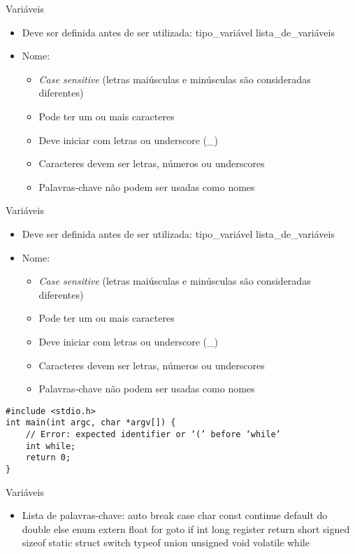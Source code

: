 \documentclass[t, aspectratio=169]{beamer}
\begin{document}
\begin{frame}[label={sec:org3450d67}]{Variáveis}
\begin{itemize}
\item Deve ser definida antes de ser utilizada: \alert{\color{highlight}tipo\_variável \color{blue!80}lista\_de\_variáveis}
\item \color{black}Nome:
\begin{itemize}
\item \emph{Case sensitive} (letras maiúsculas e minúsculas são consideradas diferentes)
\item Pode ter um ou mais caracteres
\item Deve iniciar com letras ou underscore (\_)
\item Caracteres devem ser letras, números ou underscores
\item Palavras-chave não podem ser usadas como nomes
\end{itemize}
\end{itemize}
\end{frame}

\begin{frame}[label={sec:org07d7558},fragile]{Variáveis}
 \begin{itemize}
\item Deve ser definida antes de ser utilizada: \alert{\color{highlight}tipo\_variável \color{blue!80}lista\_de\_variáveis}
\item \color{black}Nome:
\begin{itemize}
\item \emph{Case sensitive} (letras maiúsculas e minúsculas são consideradas diferentes)
\item Pode ter um ou mais caracteres
\item Deve iniciar com letras ou underscore (\_)
\item Caracteres devem ser letras, números ou underscores
\item Palavras-chave não podem ser usadas como nomes
\end{itemize}
\end{itemize}

\begin{verbatim}
#include <stdio.h>
int main(int argc, char *argv[]) {
    // Error: expected identifier or ‘(’ before ‘while’
    int while;
    return 0;
}
\end{verbatim}
\end{frame}

\begin{frame}[label={sec:orgcbd2408}]{Variáveis}
\begin{itemize}
\item Lista de palavras-chave: \alert{auto break case char const continue default do double}
\alert{else enum extern float for goto if int long register return short signed}
\alert{sizeof static struct switch typeof union unsigned void volatile while}
\end{itemize}
\end{frame}
\end{document}
